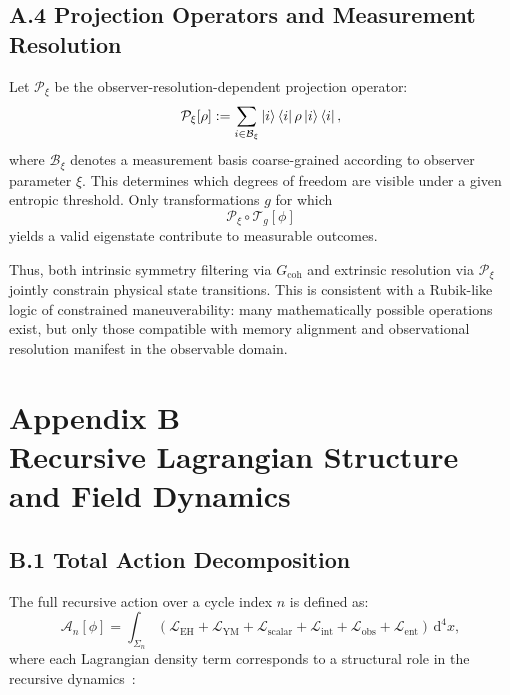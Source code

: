 \documentclass[11pt]{article}
\begin{document}
\subsection*{A.4 Projection Operators and Measurement Resolution}

Let $\mathcal{P}_{\xi}$ be the observer-resolution-dependent projection operator:
\[
\mathcal{P}_{\xi}[\rho] := \sum_{i \in \mathcal{B}_{\xi}} \ket{i}\bra{i} \rho \ket{i}\bra{i},
\]
where $\mathcal{B}_{\xi}$ denotes a measurement basis coarse-grained according to observer parameter $\xi$. This determines which degrees of freedom are visible under a given entropic threshold. Only transformations $g$ for which
\[
\mathcal{P}_{\xi} \circ \mathcal{T}_g[\phi]
\]
yields a valid eigenstate contribute to measurable outcomes.

Thus, both intrinsic symmetry filtering via $G_{\text{coh}}$ and extrinsic resolution via $\mathcal{P}_{\xi}$ jointly constrain physical state transitions. This is consistent with a Rubik-like logic of constrained maneuverability: many mathematically possible operations exist, but only those compatible with memory alignment and observational resolution manifest in the observable domain.




\section*{Appendix B\\Recursive Lagrangian Structure and Field Dynamics}
\label{appendix:B}

\subsection*{B.1 Total Action Decomposition}

The full recursive action over a cycle index \( n \) is defined as:
\[
\mathcal{A}_n[\phi] = \int_{\Sigma_n} \left( \mathcal{L}_{\text{EH}} + \mathcal{L}_{\text{YM}} + \mathcal{L}_{\text{scalar}} + \mathcal{L}_{\text{int}} + \mathcal{L}_{\text{obs}} + \mathcal{L}_{\text{ent}} \right) \, \mathrm{d}^4 x,
\]
where each Lagrangian density term corresponds to a structural role in the recursive dynamics~\cite{peskin1995introduction, nielsen2010quantum}:
\end{document}

